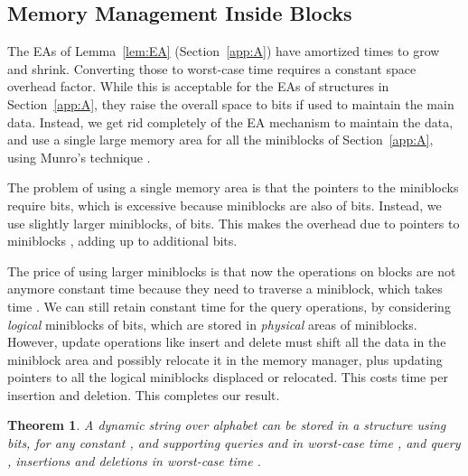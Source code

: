 \documentclass[11pt]{article}
\newcommand{\no}[1]{}
\newtheorem{theorem}{Theorem}
\begin{document}
\subsection{Memory Management Inside Blocks}

The EAs of Lemma~\ref{lem:EA} (Section~\ref{app:A})
have amortized times to grow and shrink.
Converting those to worst-case time requires a constant space overhead
factor. While this is acceptable for the EAs of structures  in 
Section~\ref{app:A}, they
raise the overall space to  bits if used to maintain the main data.
Instead, we get rid completely of the EA mechanism to maintain the data, and 
use a single large memory area for all the miniblocks
of Section~\ref{app:A}, using Munro's technique \cite{Mun86}. 

The problem of using a single memory area is that the pointers to the
miniblocks require  bits, which is excessive because miniblocks
are also of  bits. Instead, we use slightly larger miniblocks,
of  bits. This makes the overhead due to pointers
to miniblocks , adding up to additional
 bits.

The price of using larger miniblocks is that now the operations on blocks
are not anymore constant time because they need to traverse a miniblock,
which takes time . We can still retain constant time for the
query operations, by considering {\em logical} miniblocks of 
bits, which are stored in {\em physical} areas of 
miniblocks. However, update operations like insert and delete must shift 
all the data in the miniblock area and possibly relocate it in the memory 
manager, plus updating pointers to all the logical miniblocks displaced or 
relocated. This costs  time per insertion and deletion.
This completes our result.


\begin{theorem}
\label{thm:worstcase}
A dynamic string  over alphabet  
can be stored in a structure using 
 bits, for any constant ,
and supporting queries  and  in worst-case time
, and query , insertions and deletions in  worst-case time .
\end{theorem}

\no{
\section{Extensions}
\label{sec:ext}

\subsection{Handling General Alphabets}
\label{sec:alphabet}
}
\end{document}
